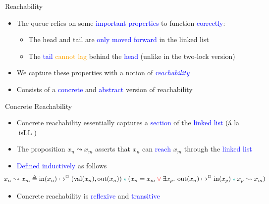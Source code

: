 \documentclass[9pt,xcolor={dvipsnames}]{beamer}
\newcommand{\isLL}{\operatorname{isLL}}
\newcommand{\nIn}[1]{\operatorname{in}(#1)}
\newcommand{\nVal}[1]{\operatorname{val}(#1)}
\newcommand{\nOut}[1]{\operatorname{out}(#1)}
\newcommand{\node}{x}
\newcommand{\nodeM}[1]{\node_{#1}}
\newcommand{\isNode}[1]{\nIn{#1} \mapsto^{\persistently} (\nVal{#1}, \nOut{#1})}
\newcommand{\reach}[2]{#1 \leadsto #2}
\let\oldlor\lor
\renewcommand{\lor}{\begingroup \color{red} \oldlor \endgroup}
\let\oldstar\star
\renewcommand{\star}{\begingroup \color{Emerald} \oldstar \endgroup}
\begin{document}
\begin{frame}{Reachability}
  \begin{itemize}
    \item The queue relies on some \textcolor{blue}{important properties} to function \textcolor{blue}{correctly}:
      \begin{itemize}
        \item The head and tail are \textcolor{blue}{only moved forward} in the linked list
        \item The \textcolor{blue}{tail} \textcolor{orange}{cannot lag} behind the \textcolor{blue}{head} (unlike in the two-lock version)
      \end{itemize}
    \pause
    \item We capture these properties with a notion of \textcolor{blue}{\textit{reachability}}
    \item Consists of a \textcolor{blue}{concrete} and \textcolor{blue}{abstract} version of reachability
  \end{itemize}
  \pause
  \begin{block}{Concrete Reachability}
    \begin{itemize}
      \item Concrete reachability essentially captures a \textcolor{blue}{section} of the \textcolor{blue}{linked list} (á la $\isLL$)
      \item<4-> The proposition $\reach{\nodeM{n}}{\nodeM{m}}$ asserts that $\nodeM{n}$ can \textcolor{blue}{reach} $\nodeM{m}$ through the \textcolor{blue}{linked list}
      \item<5-> \textcolor{blue}{Defined inductively} as follows
    \begin{equation*}
      \hspace{-2em}\reach{\nodeM{n}}{\nodeM{m}} \eqdef \isNode{\nodeM{n}} \star{} (\nodeM{n} = \nodeM{m} \lor{} \Exists \nodeM{p} . \nOut{\nodeM{n}} \mapsto^{\persistently} \nIn{\nodeM{p}} \star{} \reach{\nodeM{p}}{\nodeM{m}})
    \end{equation*}
      \item<6-> Concrete reachability is \textcolor{blue}{reflexive} and \textcolor{blue}{transitive}
    \end{itemize}
  \end{block}
\end{frame}
\end{document}
